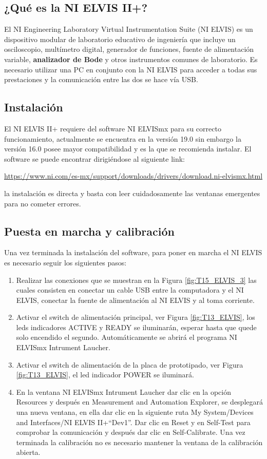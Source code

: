 		\subsection{¿Qué es la NI ELVIS II+?}
	El NI Engineering Laboratory Virtual Instrumentation Suite (NI ELVIS) es un dispositivo modular de laboratorio educativo de ingeniería que incluye un osciloscopio, multímetro digital, generador de funciones, fuente de alimentación variable, \textbf{analizador de Bode} y otros instrumentos comunes de laboratorio. Es necesario utilizar una PC en conjunto con la NI ELVIS para acceder a todas sus prestaciones y la comunicación entre las dos se hace vía USB.

		\subsection{Instalación}

	El NI ELVIS II+ requiere del software NI ELVISmx para su correcto funcionamiento, actualmente se encuentra en la versión 19.0 sin embargo la versión 16.0 posee mayor compatibilidad y es la que se recomienda instalar. El software se puede encontrar dirigiéndose al siguiente link:  

	\begin{center}
		\url{https://www.ni.com/es-mx/support/downloads/drivers/download.ni-elvismx.html}
	\end{center}
	la instalación es directa y basta con leer cuidadosamente las ventanas emergentes para no cometer errores.
		
		\subsection{Puesta en marcha y calibración}

	Una vez terminada la instalación del software, para poner en marcha el NI ELVIS es necesario seguir los siguientes pasos:
	\begin{enumerate}
		\item Realizar las conexiones que se muestran en la Figura \ref{fig:T15_ELVIS_3} las cuales consisten en conectar un cable USB entre la computadora y el NI ELVIS, conectar la fuente de alimentación al NI ELVIS y al toma corriente.
		\item Activar el switch de alimentación principal, ver Figura \ref{fig:T13_ELVIS}, los leds indicadores ACTIVE y READY se iluminarán, esperar hasta que quede solo encendido el segundo. Automáticamente se abrirá el programa NI ELVISmx Intrument Laucher.
		\item Activar el switch de alimentación de la placa de prototipado, ver Figura \ref{fig:T13_ELVIS}, el led indicador POWER se iluminará.
		\item En la ventana NI ELVISmx Intrument Laucher dar clic en la opción Resources y después en Measurement and Automation Explorer, se desplegará una nueva ventana, en ella dar clic en la siguiente ruta My System/Devices and Interfaces/NI ELVIS II+``Dev1''. Dar clic en Reset y en Self-Test para comprobar la comunicación y después dar clic en Self-Calibrate. Una vez terminada la calibración no es necesario mantener la ventana de la calibración abierta.
	\end{enumerate}		
	
